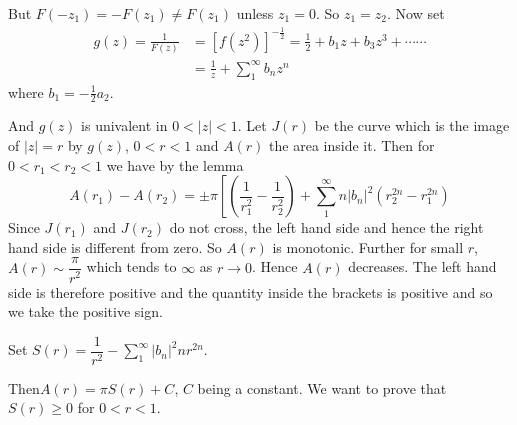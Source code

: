 But $F(-z_{1})=-F(z_{1})\neq F(z_{1})$ unless $z_{1}=0$. So
$z_{1}=z_{2}$. Now set 
\begin{align*}
g(z)=\frac{1}{F(z)} &=
\left[f(z^{2})\right]^{-\frac{1}{2}}=\frac{1}{2}+b_{1}z+b_{3}z^{3}+\cdots\cdots\\
&= \frac{1}{z}+\sum^{\infty}_{1}b_{n}z^{n}
\end{align*}
where $b_{1}=-\frac{1}{2}a_{2}$.

And $g(z)$ is univalent in $0<|z|<1$. Let $J(r)$ be the curve which is
the image of $|z|=r$ by $g(z)$, $0<r<1$ and $A(r)$ the area inside
it. Then for $0<r_{1}<r_{2}<1$ we have by the lemma
$$
A(r_{1})-A(r_{2})=\pm\pi\left[\left(\frac{1}{r^{2}_{1}}-\frac{1}{r^{2}_{2}}\right)+\sum^{\infty}_{1}n|b_{n}|^{2}(r^{2n}_{2}-r^{2n}_{1})\right.
$$
Since $J(r_{1})$ and $J(r_{2})$ do not cross, the left hand side and
hence the right hand side is different from zero. So $A(r)$ is
monotonic. Further for small $r$, $A(r)\sim \dfrac{\pi}{r^{2}}$ which
tends to $\infty$ as $r\to 0$. Hence $A(r)$ decreases. The left hand
side is therefore positive and the quantity inside the brackets is
positive and so we take the positive sign.

Set
$S(r)=\dfrac{1}{r^{2}}-\sum\limits^{\infty}_{1}|b_{n}|^{2}nr^{2n}$.

Then\pageoriginale $A(r)=\pi S(r)+C$, $C$ being a constant. We want to
prove that $S(r)\geq 0$ for $0<r<1$.

